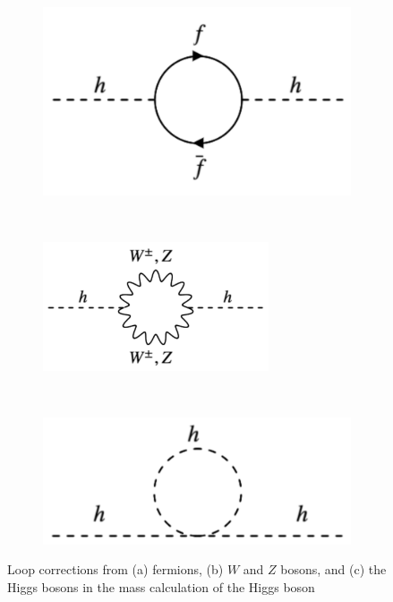 \begin{figure}[H]
    \centering
    \begin{subfigure}[b]{0.33\textwidth}
        \centering
        \includegraphics[width=\textwidth]{Pictures/HiggsFermionCorr.png}
        \caption{}
        \label{fig:FermionCorrection}
    \end{subfigure}
    ~
    \begin{subfigure}[b]{0.33\textwidth}
        \centering
        \includegraphics[width=\textwidth, height=1.5in]{Pictures/HiggsGaugeCorr.png}
    \caption{}
    \label{ref:BosonCorrection}
    \end{subfigure}
        ~
    \begin{subfigure}[b]{0.33\textwidth}
        \centering
        \includegraphics[width=\textwidth]{Pictures/HiggsHiggsCorr.png}
        \caption{}
    \end{subfigure}
    \caption{Loop corrections from (a) fermions, (b) $W$ and $Z$ bosons, and (c) the Higgs bosons in the mass calculation of the Higgs boson}
    \label{fig:HiggsCorrections}
\end{figure}

